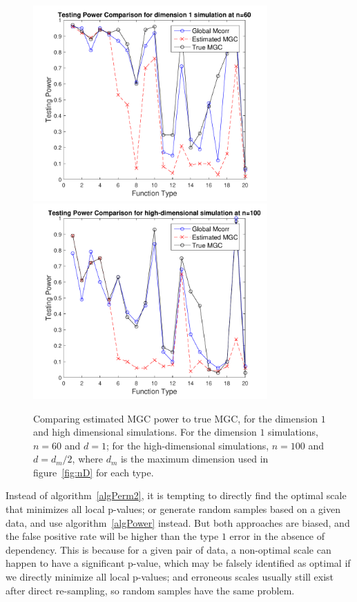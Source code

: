 \documentclass[11pt]{article}
\begin{document}
\begin{figure}[htbp]
\centering
\includegraphics[width=0.8\textwidth]{../Figures/Fig9}
\includegraphics[width=0.8\textwidth]{../Figures/Fig10}
\caption{Comparing estimated MGC power to true MGC, for the dimension $1$ and high dimensional simulations. For the dimension $1$ simulations, $n=60$ and $d=1$; for the high-dimensional simulations, $n=100$ and $d=d_{m}/2$, where $d_{m}$ is the maximum dimension used in figure~\ref{fig:nD} for each type.} 
\label{figSimPerm}
\end{figure}

Instead of algorithm~\ref{algPerm2}, it is tempting to directly find the optimal scale that minimizes all local p-values; or generate random samples based on a given data, and use algorithm~\ref{algPower} instead. But both approaches are biased, and the false positive rate will be higher than the type $1$ error in the absence of dependency. This is because for a given pair of data, a non-optimal scale can happen to have a significant p-value, which may be falsely identified as optimal if we directly minimize all local p-values; and erroneous scales usually still exist after direct re-sampling, so random samples have the same problem. 
\end{document}
